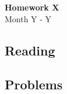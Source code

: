 \documentclass{article}
\newenvironment{envsection}[1]{\begin{trivlist}
\item[\hskip \labelsep {\bfseries #1}]}{\end{trivlist}}
\begin{document}
\setlength{\abovedisplayskip}{4pt}
\setlength{\belowdisplayskip}{4pt}


\begin{center}
    \Large{\textbf{Homework X}}\\
    \normalsize Month Y - Y
\end{center}
\vspace{10pt}

\subsection*{Reading}

\begin{envsection}{1.}

\end{envsection}

\subsection*{Problems}

\begin{envsection}{Problem 1.}
    
\end{envsection}
\end{document}
